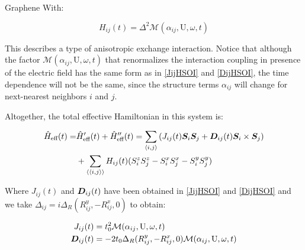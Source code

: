 \begin{section}{Graphene}
With:

\begin{equation}
H_{ij}(t) = \Delta^2 \mathcal{M}(\alpha_{ij}, \text{U}, \omega, t)
\end{equation}

This describes a type of anisotropic exchange interaction. Notice that although the factor $\mathcal{M}(\alpha_{ij}, \text{U}, \omega, t)$ that renormalizes the interaction coupling in presence of the electric field has the same form as in \ref{JijHSOI} and \ref{DijHSOI}, the time dependence will not be the same, since the structure terms $\alpha_{ij}$ will change for next-nearest neighbors $i$ and $j$.

Altogether, the total effective Hamiltonian in this system is:

\begin{align}
\hat{H}_{\text{eff}}(t) = &\hat{H}_{\text{eff}}'(t) + \hat{H}_{\text{eff}}''(t) = \sum_{\langle i,j \rangle} \left( J_{ij}(t)\boldsymbol{S}_i\boldsymbol{S}_j + \boldsymbol{D}_{ij}(t) \boldsymbol{S}_i \times \boldsymbol{S}_j \right) \nonumber \\
&+ \sum_{\langle \langle i,j \rangle \rangle} H_{ij}(t) (S_i^zS_j^z - S_i^xS_j^x - S_i^yS_j^y)
\end{align}

Where $J_{ij}(t)$ and $\boldsymbol{D}_{ij}(t)$ have been obtained in \ref{JijHSOI} and \ref{DijHSOI} and we take $\Delta_{ij} = i\Delta_R (R_{ij}^y, - R_{ij}^x, 0)$ to obtain:

\begin{align*}
J_{ij}(t) &= t_0^2\mathcal{M}(\alpha_{ij}, \text{U}, \omega, t) \\
\boldsymbol{D}_{ij}(t) &= -2t_0\Delta_R (R_{ij}^y, - R_{ij}^x, 0) \mathcal{M}(\alpha_{ij}, \text{U}, \omega, t)
\end{align*}

\end{section}
